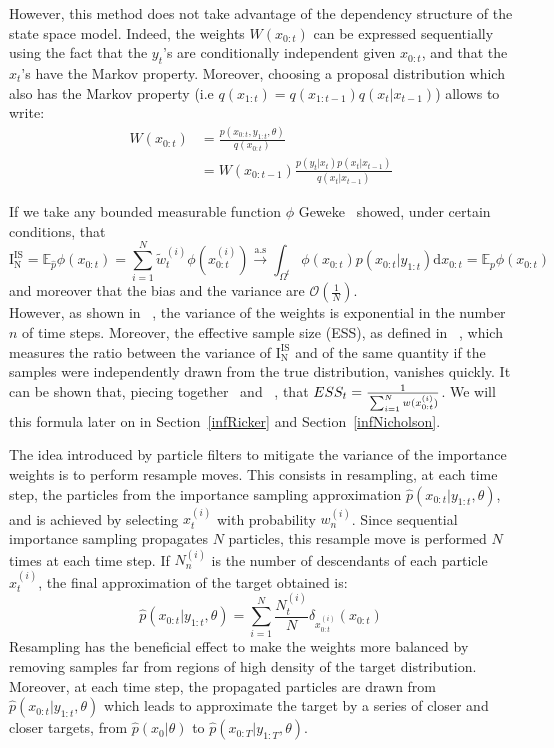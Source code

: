 \documentclass[12pt]{article}
\begin{document}
	However, this method does not take advantage of the dependency structure of the state space model. Indeed, the weights $W(x_{0:t})$ can be expressed sequentially using the fact that the $y_t$'s are conditionally independent given $x_{0:t}$, and that the $x_t$'s have the Markov property. Moreover, choosing a proposal distribution which also has the Markov property (i.e $q(x_{1:t})=q(x_{1:t-1})q(x_t| x_{t-1})$) allows to write:
	\begin{align}
		W(x_{0:t}) & = \frac{p(x_{0:t},y_{1:t}, \theta)}{q(x_{0:t})} \\
		& = W(x_{0:t-1})\frac{p(y_t|x_t)p(x_t|x_{t-1})}{q(x_t|x_{t-1})}
	\end{align}
	
	If we take any bounded measurable function $\phi$ Geweke~\cite{Geweke1989} showed, under certain conditions, that \begin{equation*}
		 \mathrm{I_N^{IS}}=\mathbb{E}_{\hat{p}}\phi(x_{0:t}) = \sum_{i=1}^{N} \tilde{w}_t^{(i)} \phi(x_{0:t}^{(i)}) \xrightarrow{\mathrm{a.s}} \int_{\Omega^t} \phi({x_{0:t}})p(x_{0:t}|y_{1:t})\mathrm{d}x_{0:t}=\mathbb{E}_{p}\phi(x_{0:t})
	\end{equation*}
	and moreover that the bias and the variance are $\mathcal{O}(\frac{1}{N})$.\\
	
	However, as shown in ~\cite{kong1994sequential}, the variance of the weights is exponential in the number $n$ of time steps. Moreover, the effective sample size (ESS), as defined in ~\cite{liu2008monte}, which measures the ratio between the variance of $\mathrm{I_N^{IS}}$ and of the same quantity if the samples were independently drawn from the true distribution, vanishes quickly.  It can be shown that, piecing together~\cite[][pp.~35-36]{liu2008monte} and ~\cite[][pp.~98-100]{robert2009introducing}, that  $ESS_t = \frac{1}{\strut \sum_{i=1}^{N} w(x_{0:t}^{(i)})}$. We will this formula later on in Section~\ref{infRicker} and Section~\ref{infNicholson}.
	
	The idea introduced by particle filters to mitigate the variance of the importance weights is to perform resample moves. This consists in resampling, at each time step, the particles from the importance sampling approximation $\hat{p}(x_{0:t}|y_{1:t}, \theta)$, and is achieved by selecting $x_t^{(i)}$ with probability $w_n^{(i)}$. Since sequential importance sampling propagates $N$ particles, this resample move is performed $N$ times at each time step. If $N_n^{(i)}$ is the number of descendants of each particle $x_t^{(i)}$, the final approximation of the target obtained is:
	\begin{equation*}
	 	\hat{p}(x_{0:t}|y_{1:t}, \theta) = \sum_{i=1}^{N}\frac{N_t^{(i)}}{N} \delta_{x_{0:t}^{(i)}}(x_{0:t})
	\end{equation*}
	Resampling has the beneficial effect to make the weights more balanced by removing samples far from regions of high density of the target distribution. Moreover, at each time step, the propagated particles are drawn from $\hat{p}(x_{0:t}|y_{1:t}, \theta)$ which leads to approximate the target by a series of closer and closer targets, from $\hat{p}(x_0|\theta)$ to $\hat{p}(x_{0:T}|y_{1:T}, \theta)$.
	 
\end{document}
